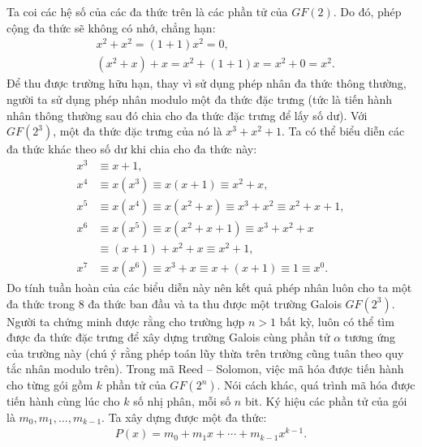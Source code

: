 \begin{multicols}{2}
	\vskip 0.1cm
	Ta coi các hệ số của các đa thức trên là các phần tử của $GF(2)$. Do đó, phép cộng đa thức sẽ không có nhớ, chẳng hạn:
	\begin{align*}
		&x^2+x^2=(1+1) x^2=0,\\
		&(x^2+x)+x=x^2+(1+1)x=x^2+0=x^2.
	\end{align*}
	Để thu được trường hữu hạn, thay vì sử dụng phép nhân đa thức thông thường, người ta sử dụng phép nhân modulo một đa thức đặc trưng (tức là tiến hành nhân thông thường sau đó chia cho đa thức đặc trưng để lấy số dư). Với $GF(2^3)$, một đa thức đặc trưng của nó là $x^3+x^2+1$. Ta có thể biểu diễn các đa thức khác theo số dư khi chia cho đa thức này:
	\begin{align*}
		x^3&\equiv x+1,\\
		x^4&\equiv x(x^3 )\equiv x(x+1)\equiv x^2+x,\\
		x^5&\equiv x(x^4 )\!\equiv \!x(x^2\!+\!x)\!\equiv\! x^3\!+\!x^2\!\equiv\! x^2\!+\!x\!+\!1,\\
		x^6&\equiv x(x^5 )\equiv x(x^2+x+1)\equiv x^3+x^2+x\\
		&\equiv(x+1)+x^2+x\equiv x^2+1,\\
		x^7&\equiv x(x^6 )\equiv x^3\!+\!x\equiv x\!+\!(x\!+\!1)\equiv 1\equiv x^0.
	\end{align*}
	Do tính tuần hoàn của các biểu diễn này nên kết quả phép nhân luôn cho ta một đa thức trong $8$ đa thức ban đầu và ta thu được một trường Galois $GF(2^3)$. Người ta chứng minh được rằng cho trường hợp $n>1$ bất kỳ, luôn có thể tìm được đa thức đặc trưng để xây dựng trường Galois cùng phần tử $\alpha$ tương ứng của trường này (chú ý rằng phép toán lũy thừa trên trường cũng tuân theo quy tắc nhân modulo trên).
	\vskip 0.1cm
	Trong mã Reed -- Solomon, việc mã hóa được tiến hành cho từng gói gồm $k$ phần tử của $GF(2^n)$. Nói cách khác, quá trình mã hóa được tiến hành cùng lúc cho $k$ số nhị phân, mỗi số $n$ bit. Ký hiệu các phần tử của gói là $m_0,m_1,\ldots,m_{k-1}$. Ta xây dựng được một đa thức:
	\begin{align*}
		P(x)=m_0+m_1x+ \cdots +m_{k-1} x^{k-1}.
	\end{align*}

\end{multicols}
